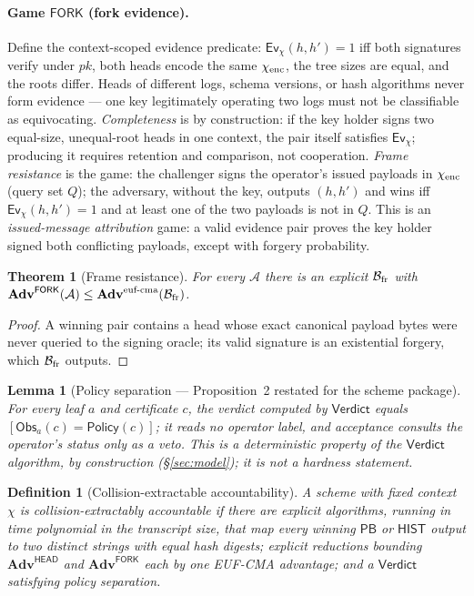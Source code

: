 \documentclass[11pt]{article}
\newtheorem{definition}{Definition}
\newtheorem{theorem}{Theorem}
\newtheorem{lemma}{Lemma}
\theoremstyle{remark}
\newcommand{\Obs}{\mathsf{Obs}}
\newcommand{\Policy}{\mathsf{Policy}}
\begin{document}
\paragraph{Game $\mathsf{FORK}$ (fork evidence).}
Define the context-scoped evidence predicate:
$\mathsf{Ev}_\chi(h,h')=1$ iff both signatures verify under $pk$, both heads
encode the same $\chi_{\rm enc}$, the tree sizes are equal, and the roots
differ. Heads of
different logs, schema versions, or hash algorithms never form evidence ---
one key legitimately operating two logs must not be classifiable as
equivocating. \emph{Completeness} is by construction: if the key holder signs
two equal-size, unequal-root heads in one context, the pair itself satisfies
$\mathsf{Ev}_\chi$; producing it requires retention and comparison, not
cooperation. \emph{Frame resistance} is the game: the challenger signs the
operator's issued payloads in $\chi_{\rm enc}$ (query set $Q$); the
adversary, without the key, outputs $(h,h')$ and wins iff $\mathsf{Ev}_\chi(h,h')=1$ and at
least one of the two payloads is not in $Q$. This is an
\emph{issued-message attribution} game: a valid evidence pair proves the key
holder signed both conflicting payloads, except with forgery probability.

\begin{theorem}[Frame resistance]\label{thm:fork}
For every $\mathcal{A}$ there is an explicit $\mathcal{B}_{\rm fr}$ with
$\mathbf{Adv}^{\mathsf{FORK}}(\mathcal{A})\le
\mathbf{Adv}^{\text{euf-cma}}(\mathcal{B}_{\rm fr})$.
\end{theorem}
\begin{proof}
A winning pair contains a head whose exact canonical payload bytes were never
queried to the signing oracle; its valid signature is an existential forgery,
which $\mathcal{B}_{\rm fr}$ outputs.
\end{proof}

\begin{lemma}[Policy separation --- Proposition~2 restated for the scheme package]\label{lem:policy}
For every leaf $a$ and certificate $c$, the verdict computed by
$\mathsf{Verdict}$ equals $[\Obs_a(c)=\Policy(c)]$; it reads no operator
label, and acceptance consults the operator's status only as a veto. This is
a deterministic property of the $\mathsf{Verdict}$ algorithm, by construction
(\S\ref{sec:model}); it is not a hardness statement.
\end{lemma}

\begin{definition}[Collision-extractable accountability]\label{def:formal}
A scheme with fixed context $\chi$ is \emph{collision-extractably
accountable} if there are explicit algorithms, running in time polynomial in
the transcript size, that map every winning $\mathsf{PB}$ or $\mathsf{HIST}$
output to two distinct strings with equal hash digests; explicit reductions
bounding $\mathbf{Adv}^{\mathsf{HEAD}}$ and $\mathbf{Adv}^{\mathsf{FORK}}$
each by one EUF-CMA advantage; and a $\mathsf{Verdict}$ satisfying policy
separation.
\end{definition}
\end{document}
